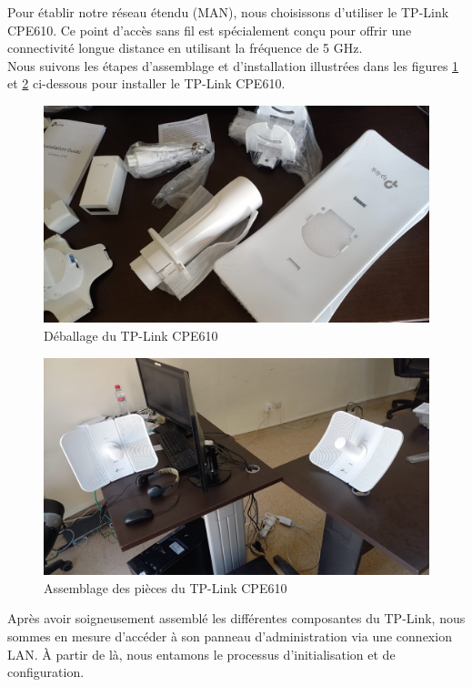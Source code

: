 Pour établir notre réseau étendu (MAN), nous choisissons  d'utiliser le TP-Link CPE610. Ce point d'accès sans fil est spécialement conçu pour offrir une connectivité longue distance en utilisant la fréquence de 5 GHz. \\

Nous suivons les étapes d'assemblage et d'installation illustrées dans les figures \ref{Chap2.3.2} et \ref{Chap2.3.4} ci-dessous pour installer le TP-Link CPE610.\\

\begin{figure}[H]
\centering
\includegraphics[width=15cm]{Images/SetupTPL4.jpg}
\caption{Déballage du TP-Link CPE610}
\label{Chap2.3.2}
\end{figure}

\begin{figure}[H]
\centering
\includegraphics[width=15cm]{Images/SetupTPL1.jpg}
\caption{Assemblage des pièces du TP-Link CPE610}
\label{Chap2.3.4}
\end{figure}


Après avoir soigneusement assemblé les différentes composantes du TP-Link, nous sommes en mesure d'accéder à son panneau d'administration via une connexion LAN. À partir de là, nous entamons le processus d'initialisation et de configuration.

